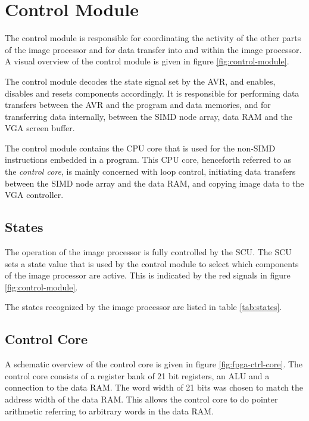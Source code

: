 \section{Control Module}

The control module is responsible for coordinating the activity of the
other parts of the image processor and for data transfer into and within
the image processor. A visual overview of the control module is given in
figure \ref{fig:control-module}.



The control module decodes the state signal set by the AVR, and enables,
disables and resets components accordingly. It is responsible for performing
data transfers between the AVR and the program and data memories, and for
transferring data internally, between the \ac{SIMD} node array, data \ac{RAM}
and the \ac{VGA} screen buffer.

The control module contains the \ac{CPU} core that is used for the non-\ac{SIMD}
instructions embedded in a program. This \ac{CPU} core, henceforth referred to
as the \emph{control core}, is mainly concerned with loop control, initiating
data transfers between the \ac{SIMD} node array and the data RAM, and copying
image data to the \ac{VGA} controller.

\subsection{States}

The operation of the image processor is fully controlled by the \ac{SCU}. The
\ac{SCU} sets a state value that is used by the control module to select which
components of the image processor are active. This is indicated by the red
signals in figure \ref{fig:control-module}.

The states recognized by the image processor are listed in table
\ref{tab:states}.



\subsection{Control Core}

A schematic overview of the control core is given in figure
\ref{fig:fpga-ctrl-core}. The control core consists of a register bank
of 21 bit registers, an \ac{ALU} and a connection to the data \ac{RAM}. The word
width of 21 bits was chosen to match the address width of the data \ac{RAM}.
This allows the control core to do pointer arithmetic referring to
arbitrary words in the data \ac{RAM}.

